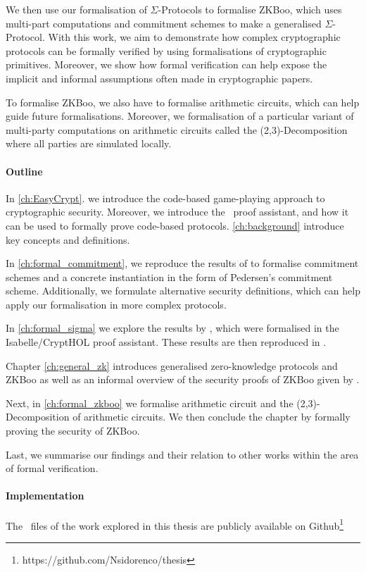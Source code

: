 We then use our formalisation of $\Sigma$-Protocols to formalise ZKBoo, which
uses multi-part computations and commitment schemes to make
a generalised $\Sigma$-Protocol. With this work, we aim to demonstrate how complex
cryptographic protocols can be formally verified by using formalisations of
cryptographic primitives. Moreover, we show how formal verification can help expose
the implicit and informal assumptions often made in cryptographic papers.

To formalise ZKBoo, we also have to formalise arithmetic circuits, which can help
guide future formalisations. Moreover, we formalisation of a particular variant
of multi-party computations on arithmetic circuits called the
(2,3)-Decomposition where all parties are simulated locally.


\paragraph{Outline}
In \autoref{ch:EasyCrypt}. we introduce the code-based game-playing approach to
cryptographic security. Moreover, we introduce the \easycrypt\ proof assistant,
and how it can be used to formally prove code-based protocols.
\autoref{ch:background} introduce key concepts and definitions.

In \autoref{ch:formal_commitment}, we reproduce the results of
\cite{DBLP:journals/corr/MetereD17} to formalise commitment schemes and a
concrete instantiation in the form of Pedersen's commitment scheme.
Additionally, we formulate alternative security definitions, which can help
apply our formalisation in more complex protocols.

In \autoref{ch:formal_sigma} we explore the results by
\cite{cryptoeprint:2019:1185}, which were formalised in the Isabelle/CryptHOL
proof assistant. These results are then reproduced in \easycrypt.

Chapter \ref{ch:general_zk} introduces generalised zero-knowledge protocols and
ZKBoo as well as an informal overview of the security proofs of ZKBoo given by \cite{zkboo}.

Next, in \autoref{ch:formal_zkboo} we formalise arithmetic circuit and the
(2,3)-Decomposition of arithmetic circuits. We then conclude the chapter by
formally proving the security of ZKBoo.

Last, we summarise our findings and their relation to other works within the
area of formal verification.

\paragraph{Implementation}
The \easycrypt\ files of the work explored in this thesis
are publicly available on Github\footnote{https://github.com/Nsidorenco/thesis}


